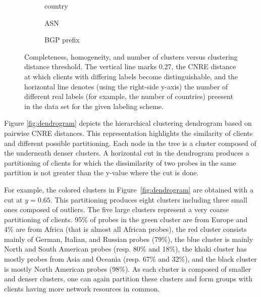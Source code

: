 \begin{figure}
    \center
            \begin{subfigure}[b]{0.8\linewidth}
                \caption{country} 
            \end{subfigure}
            \begin{subfigure}[b]{0.8\linewidth}
                \caption{ASN} 
            \end{subfigure}
            \begin{subfigure}[b]{0.8\linewidth}
                \caption{BGP prefix} 
                \label{fig:chbgp}
            \end{subfigure}
    \caption{Completeness, homogeneity, and number of clusters versus clustering
    distance threshold. The vertical line marks 0.27, the CNRE distance at which
    clients with differing labels become distinguishable, and the horizontal
    line denotes (using the right-side y-axis) the number of different real labels
    (for example, the number of countries) preesent in the data set for the
    given labeling scheme.}
    \label{fig:ch}
\end{figure}


Figure \ref{fig:dendrogram} depicts the hierarchical clustering dendrogram based 
on pairwise CNRE distances.
This representation highlights the similarity of clients and different possible 
partitioning.
Each node in the tree is a cluster composed of the underneath denser clusters.
A horizontal cut in the dendrogram produces a partitioning of clients  for which
the dissimilarity of two probes in the same partition is not greater than the 
y-value where the cut is done. 

For example, the colored clusters in Figure~\ref{fig:dendrogram} are obtained 
with a cut at $y=0.65$.
This partitioning produces eight clusters including three small ones 
composed of outliers.
The five large clusters represent a very coarse partitioning of clients.
95\% of probes in the green cluster are from Europe and 4\% are from Africa 
(that is almost all African probes), the red cluster consists mainly of
German, Italian, and Russian probes (79\%), the blue cluster is mainly North and
South American probes (resp. 80\% and 18\%), the khaki cluster has mostly probes
from Asia and Oceania (resp. 67\% and 32\%), and the black cluster is mostly
North American probes (98\%).
As each cluster is composed of smaller and denser clusters, one can again partition
these clusters and form groups with clients having more network resources in common.
